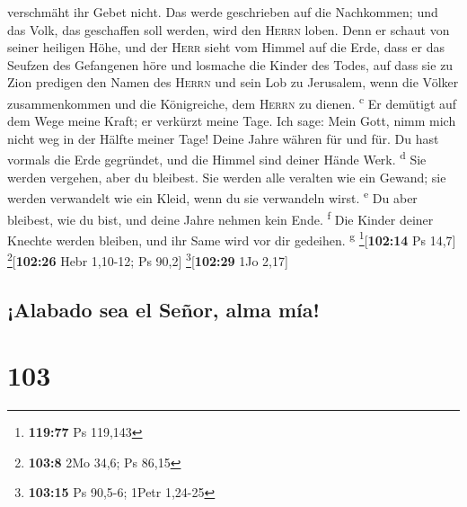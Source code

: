 verschmäht ihr Gebet nicht.  Das werde geschrieben auf
die Nachkommen; und das Volk, das geschaffen soll werden, wird den
\textsc{Herrn} loben.  Denn er schaut von seiner heiligen
Höhe, und der \textsc{Herr} sieht vom Himmel auf die Erde,
 dass er das Seufzen des Gefangenen höre und losmache die
Kinder des Todes,  auf dass sie zu Zion predigen den
Namen des \textsc{Herrn} und sein Lob zu Jerusalem,  wenn
die Völker zusammenkommen und die Königreiche, dem \textsc{Herrn} zu
dienen. \textsuperscript{c}  Er demütigt auf dem Wege
meine Kraft; er verkürzt meine Tage.  Ich sage: Mein
Gott, nimm mich nicht weg in der Hälfte meiner Tage! Deine Jahre währen
für und für.  Du hast vormals die Erde gegründet, und die
Himmel sind deiner Hände Werk. \textsuperscript{d}  Sie
werden vergehen, aber du bleibest. Sie werden alle veralten wie ein
Gewand; sie werden verwandelt wie ein Kleid, wenn du sie verwandeln
wirst. \textsuperscript{e}  Du aber bleibest, wie du
bist, und deine Jahre nehmen kein Ende. \textsuperscript{f}
 Die Kinder deiner Knechte werden bleiben, und ihr Same
wird vor dir gedeihen. \textsuperscript{g} \footnote{\textbf{119:77} Ps
  119,143}{[}\textbf{102:14} Ps 14,7{]} \footnote{\textbf{103:8} 2Mo
  34,6; Ps 86,15}{[}\textbf{102:26} Hebr 1,10-12; Ps 90,2{]}
\footnote{\textbf{103:15} Ps 90,5-6; 1Petr 1,24-25}{[}\textbf{102:29}
1Jo 2,17{]}

\hypertarget{alabado-sea-el-seuxf1or-alma-muxeda}{%
\subsection{¡Alabado sea el Señor, alma
mía!}\label{alabado-sea-el-seuxf1or-alma-muxeda}}

\hypertarget{section-102}{%
\section{103}\label{section-102}}

